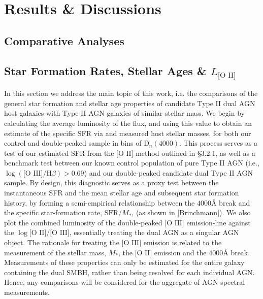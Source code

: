 \section{Results \& Discussions}

\subsection{Comparative Analyses}

\subsection{Star Formation Rates, Stellar Ages \& $L_{\text{[O II]}}$}

In this section we address the main topic of this work, i.e. the comparisons of the general star formation and stellar age properties of candidate Type II dual AGN host galaxies with Type II AGN galaxies of similar stellar mass. We begin by calculating the average luminosity of the \text{[O II]} flux, and using this value to obtain an estimate of the specific SFR via \label{eq:Kewley} and measured host stellar masses, for both our control and double-peaked sample in bins of $\text{D}_n(4000)$. This process serves as a test of our estimated SFR from the $\text{[O II]}$ method outlined in §3.2.1, as well as a benchmark test between our known control population of pure Type II AGN (i.e., $\log{(\text{[O III]}/\text{H}\beta)}>{0.69}$) and our double-peaked candidate dual Type II AGN sample. By design, this diagnostic serves as a proxy test between the instantaneous SFR and the mean stellar age and subsequent star formation history, by forming a semi-empirical relationship between the $4000Å$ break and the specific star-formation rate, $\text{SFR}/M_{*}$, (as shown in \ref{Brinchmann}). We also plot the combined luminosity of the double-peaked $\text{[O III]}$ emission-line against the $\log{\text{[O II]}/\text{[O III]}}$, essentially treating the dual AGN as a singular AGN object. The rationale for treating the $\text{[O III]}$ emission is related to the measurement of the stellar mass, $M_{*}$, the $\text{[O II]}$ emission and the $4000Å$ break. Measurements of these properties can only be estimated for the entire galaxy containing the dual SMBH, rather than being resolved for each individual AGN. Hence, any comparisons will be considered for the aggregate of AGN spectral measurements.     


